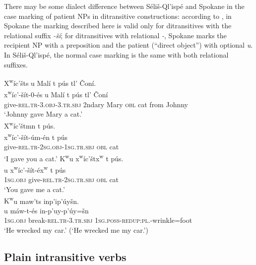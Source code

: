 \documentclass[output=paper,colorlinks,citecolor=brown]{langscibook}
\begin{document}
  There may be some dialect difference between S\'eli\v{s}-Ql'isp\'e
  and Spokane in the case marking of patient NPs in ditransitive
  constructions: according to \citet[24]{Carlson:1980}, in Spokane the
  marking described here is valid only for ditransitives with the
  relational suffix \emph{-\v{s}\'i}; for ditransitives with
  relational \emph{-{\textltilde}}, Spokane marks the recipient NP
  with a preposition and the patient (``direct object'') with
  optional \emph{{\textltilde}u}.  In S\'eli\v{s}-Ql'isp\'e, the
  normal case marking is the same with both relational suffixes.\largerpage[-1]


\ea 
\label{ex-thomason-7}
X\textsuperscript w\'ic'\v{s}ts {\textltilde}u Mal\'i t p\'us tl' \v{C}on\'i. \\
\gll x\textsuperscript w\'ic'-\v{s}\'it-0-\'es {\textltilde}u Mal\'i t p\'us tl' \v{C}on\'i\\
     give-\textsc{rel.tr}-3.\textsc{obj}-3.\textsc{tr.sbj} 2ndary Mary \textsc{  obl} cat from Johnny\\
\glt `Johnny gave Mary a cat.' \\
\pagebreak
\ex X\textsuperscript w\'ic'\v{s}tmn t p\'us.  \\
\label{ex-thomason-8}
\gll x\textsuperscript w\'ic'-\v{s}\'it-\'um-\'en t p\'us\\
give-\textsc{rel.tr}-\textsc{2sg}.\textsc{obj}-\textsc{1sg}.\textsc{tr.sbj} \textsc{obl} cat\\
\glt `I gave you a cat.'
\ex 
\label{ex-thomason-9}
{K\textsuperscript w}u x\textsuperscript w\'ic'\v{s}tx\textsuperscript w t  p\'us. \\
 u x\textsuperscript
w\'ic'-\v{s}\'it-\'ex\textsuperscript w t p\'us\\
\textsc{1sg}.\textsc{obj} give-\textsc{rel.tr}-\textsc{2sg}.\textsc{tr.sbj} \textsc{obl} cat \\
 \glt  `You gave me a cat.'\\
 \ex 
\label{ex-thomason-10}
{K\textsuperscript w}u maw'{\textltilde}ts inp'ip'\'uy\v{s}n. \\
u m\'aw-{\textltilde}t-\'es in-p'uy-p'\'uy=\v{s}n\\
     \textsc{1sg}.\textsc{obj} break-\textsc{rel.tr}-3.\textsc{tr.sbj} \textsc{1sg}.\textsc{poss}-\textsc{redup:pl}.-wrinkle=foot \\
\glt `He wrecked my car.' (`He wrecked me my car.')
\z

\subsection{Plain intransitive verbs}  %
\label{thomason_section_2.3}
\end{document}
